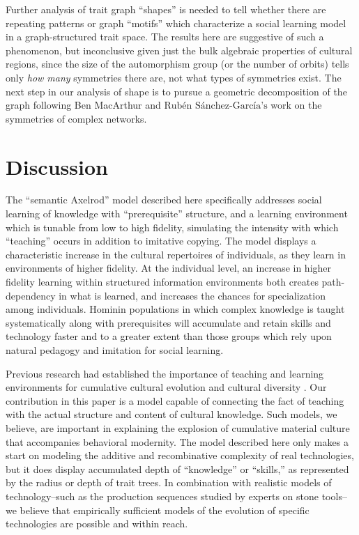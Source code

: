 Further analysis of trait graph ``shapes'' is needed to tell whether
there are repeating patterns or graph ``motifs'' which characterize a
social learning model in a graph-structured trait space. The results
here are suggestive of such a phenomenon, but inconclusive given just
the bulk algebraic properties of cultural regions, since the size of the
automorphism group (or the number of orbits) tells only \emph{how many}
symmetries there are, not what types of symmetries exist. The next step
in our analysis of shape is to pursue a geometric decomposition of the
graph following Ben MacArthur and
$\textrm{Rub\'en S\'anchez-Garc\'ia's}$
\citeyearpar{macarthur2008symmetry} work on the symmetries of complex
networks.

\section{Discussion}\label{semax:sec:discussion}


The ``semantic Axelrod'' model described here specifically addresses
social learning of knowledge with ``prerequisite'' structure, and a
learning environment which is tunable from low to high fidelity,
simulating the intensity with which ``teaching'' occurs in addition to
imitative copying. The model displays a characteristic increase in the
cultural repertoires of individuals, as they learn in environments of
higher fidelity. At the individual level, an increase in higher fidelity
learning within structured information environments both creates
path-dependency in what is learned, and increases the chances for
specialization among individuals. Hominin populations in which complex
knowledge is taught systematically along with prerequisites will
accumulate and retain skills and technology faster and to a greater
extent than those groups which rely upon natural pedagogy and imitation
for social learning.

Previous research had established the importance of teaching and
learning environments for cumulative cultural evolution and cultural
diversity
\citep{Aoki2013Determinants-of, Castro201474, Creanza2013Exploring-Cultu, Nakahashi2013Cultural-Evolut}.
Our contribution in this paper is a model capable of connecting the fact
of teaching with the actual structure and content of cultural knowledge.
Such models, we believe, are important in explaining the explosion of
cumulative material culture that accompanies behavioral modernity. The
model described here only makes a start on modeling the additive and
recombinative complexity of real technologies, but it does display
accumulated depth of ``knowledge'' or ``skills,'' as represented by the
radius or depth of trait trees. In combination with realistic models of
technology--such as the production sequences studied by experts on stone
tools--we believe that empirically sufficient models of the evolution of
specific technologies are possible and within reach.

